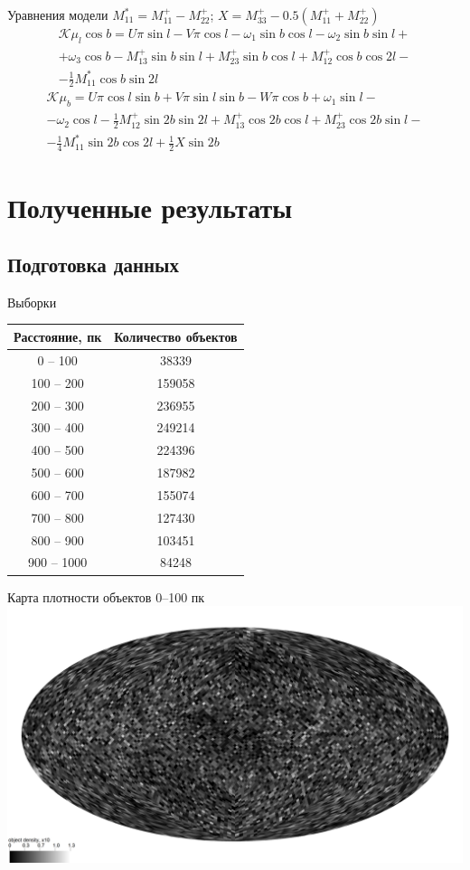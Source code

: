 \documentclass{beamer}
\begin{document}
\begin{frame}{Уравнения модели}
$M_{11}^*=M_{11}^+-M_{22}^+$; $X=M_{33}^+-0.5\left(M_{11}^++M_{22}^+\right)$
\begin{multline}\label{Kmul_plus}
\mathcal{K}\mu_l\cos b=U\pi\sin l-V\pi\cos l-\omega_1\sin b\cos l-\omega_2\sin b\sin l+\\+\omega_3\cos b-M_{13}^+\sin b\sin l+M_{23}^+\sin b\cos l+M_{12}^+\cos b\cos2l-\\-\frac{1}{2}M_{11}^*\cos b\sin2l
\end{multline}
\begin{multline}\label{Kmub_plus}
\mathcal{K}\mu_b=U\pi\cos l\sin b+V\pi\sin l\sin b-W\pi\cos b+\omega_1\sin l-\\-\omega_2\cos l-\frac{1}{2}M_{12}^+\sin2b\sin2l+M_{13}^+\cos2b\cos l+M_{23}^+\cos2b\sin l-\\-\frac{1}{4}M_{11}^*\sin2b\cos2l+\frac{1}{2}X\sin2b
\end{multline}
\end{frame}

\section{Полученные результаты}
\subsection{Подготовка данных}
\begin{frame}{Выборки}
\center\begin{tabular}{|c|c|}
\hline
Расстояние, пк&Количество объектов\\
\hline
0 -- 100&38339\\
100 -- 200&159058\\
200 -- 300&236955\\
300 -- 400&249214\\
400 -- 500&224396\\
500 -- 600&187982\\
600 -- 700&155074\\
700 -- 800&127430\\
800 -- 900&103451\\
900 -- 1000&84248\\
\hline
\end{tabular}
\end{frame}

\begin{frame}{Карта плотности объектов 0--100 пк}
\includegraphics[width=1\linewidth]{healpdens100.jpg}
\end{frame}
\end{document}
